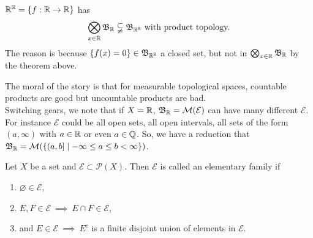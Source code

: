 \documentclass[11pt,leqno,oneside]{amsbook}
\numberwithin{thm}{section}
\renewcommand{\P}{\mathcal{P}}
\newcommand{\M}{\mathcal{M}}
\newcommand{\Ep}{\mathcal{E}}
\begin{document}
\begin{example}
  ${\mathbb R}^{\mathbb R} = \{f: {\mathbb R} \to {\mathbb R}\}$ has \[
    \bigotimes_{x \in {\mathbb R}} \mathfrak{B}_{\mathbb R} \subsetneqq \mathfrak{B}_{{\mathbb R}^{\mathbb R}} \text{ with
      product topology.}
  \]
  The reason is because $\{f(x) = 0\} \in \mathfrak{B}_{{\mathbb R}^{\mathbb R}}$ a closed set,
  but not in $\bigotimes_{x \in {\mathbb R}} \mathfrak{B}_{\mathbb R}$ by the theorem above.
\end{example}
The moral of the story is that for measurable topological spaces,
countable products are good but uncountable products are bad. \\

Switching gears, we note that if $X = {\mathbb R}$, $\B_\R = \M(\Ep)$ can have
many different $\Ep$. For instance $\Ep$ could be all open sets, all
open intervals, all sets of the form $(a, \infty)$ with $a \in {\mathbb R}$ or
even $a \in {\mathbb Q}$. So, we have a reduction that $\B_\R = \M(\{(a,b] \mid
-\infty \leq a \leq b < \infty\})$.
\begin{defn}
  Let $X$ be a set and $\Ep \subset \P(X)$. Then $\Ep$ is called an
  elementary family if
  \begin{enumerate}
  \item $\varnothing \in \Ep$,
  \item $E,F \in \Ep \ \implies \ E \cap F \in \Ep$,
  \item and $E \in \Ep \ \implies \ E^c$ is a finite disjoint union of
    elements in $\Ep$. 
  \end{enumerate}
\end{defn}
\end{document}

